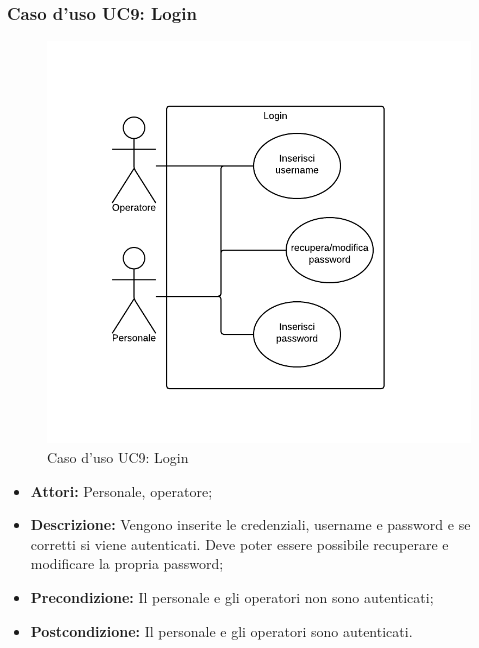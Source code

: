 \subsubsection{Caso d'uso UC9: Login}
\begin{figure}[H]
\centering
\includegraphics[width=1\textwidth]{images/UC9.png}
\caption{Caso d'uso UC9: Login}
\end{figure}
\begin{itemize}
\item \textbf{Attori:} Personale, operatore;
\item \textbf{Descrizione:} Vengono inserite le credenziali, username e password e se corretti si viene autenticati. Deve poter essere possibile recuperare e modificare la propria password;
\item \textbf{Precondizione:} Il personale e gli operatori non sono autenticati;
\item \textbf{Postcondizione:}  Il personale e gli operatori sono autenticati.
\end{itemize}

